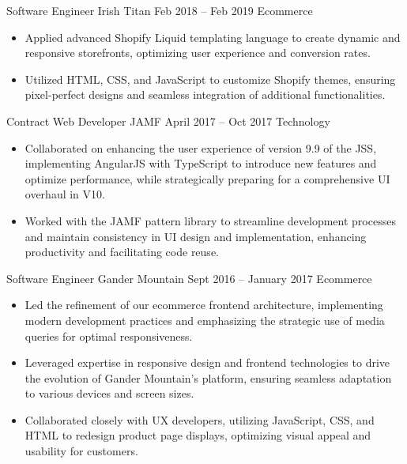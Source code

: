\medskip

\cvexperience
{Software Engineer}
{Irish Titan}
{Feb 2018 – Feb 2019}
{Ecommerce}
{\footnotesize\faCode \hspace{.5pt}       }
\begin{itemize}
    \item Applied advanced Shopify Liquid templating language to create dynamic and responsive storefronts, optimizing user experience and conversion rates.
    \item Utilized HTML, CSS, and JavaScript to customize Shopify themes, ensuring pixel-perfect designs and seamless integration of additional functionalities.
\end{itemize}

\medskip
\cvexperience
{Contract Web Developer}
{JAMF}
{April 2017 – Oct 2017}
{Technology}
{\footnotesize\faCode \hspace{1pt}  }
\begin{itemize}
    \item Collaborated on enhancing the user experience of version 9.9 of the JSS, implementing AngularJS with TypeScript to introduce new features and optimize performance, while strategically preparing for a comprehensive UI overhaul in V10.
    \item Worked with the JAMF pattern library to streamline development processes and maintain consistency in UI design and implementation, enhancing productivity and facilitating code reuse.
\end{itemize}

\medskip

\cvexperience
{Software Engineer}
{Gander Mountain}
{Sept 2016 – January 2017}
{Ecommerce}
{\footnotesize\faCode \hspace{1pt}      }
\begin{itemize}
    \item Led the refinement of our ecommerce frontend architecture, implementing modern development practices and emphasizing the strategic use of media queries for optimal responsiveness.
    \item Leveraged expertise in responsive design and frontend technologies to drive the evolution of Gander Mountain's platform, ensuring seamless adaptation to various devices and screen sizes.
    \item Collaborated closely with UX developers, utilizing JavaScript, CSS, and HTML to redesign product page displays, optimizing visual appeal and usability for customers.
\end{itemize}


